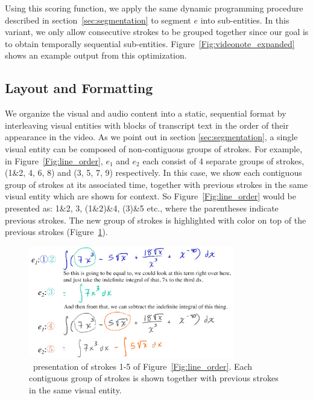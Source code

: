 Using this scoring function, we apply the same dynamic programming procedure described in section~\ref{sec:segmentation} to segment $e$ into sub-entities. In this variant, we only allow consecutive strokes to be grouped together since our goal is to obtain temporally sequential sub-entities. Figure~\ref{Fig:videonote_expanded} shows an example output from this optimization.  
\subsection{Layout and Formatting}
\label{sec:layout}
We organize the visual and audio content into a static, sequential format by interleaving visual entities with blocks of transcript text in the order of their appearance in the video. As we point out in section \ref{sec:segmentation}, a single visual entity can be composed of non-contiguous groups of strokes. For example, in Figure~\ref{Fig:line_order}, $e_1$ and $e_2$ each consist of 4 separate groups of strokes, (1\&2, 4, 6, 8) and (3, 5, 7, 9) respectively. In this case, we show each contiguous group of strokes at its associated time, together with previous strokes in the same visual entity which are shown for context. So Figure~\ref{Fig:line_order} would be presented as: 1\&2, 3, (1\&2)\&4, (3)\&5 etc., where the parentheses indicate previous strokes. The new group of strokes is highlighted with color on top of the previous strokes (Figure~\ref{Fig:layout_line_order}). 
\begin{figure}[h!]
        \centering
        \includegraphics[width=0.8\textwidth]{figures/layout_line_order.pdf}
        \captionsetup{font=footnotesize}
        \caption{\systemname\ presentation of strokes 1-5 of Figure~\ref{Fig:line_order}. Each contiguous group of strokes is shown together with previous strokes in the same visual entity.}
        \label{Fig:layout_line_order}
\end{figure}\\


